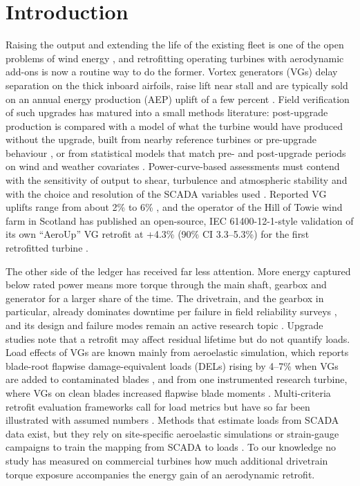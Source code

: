 \documentclass[preprint,12pt]{elsarticle}
\begin{document}
\linenumbers

\section{Introduction}

Raising the output and extending the life of the existing fleet is one of the open problems of wind energy \cite{veers19}, and retrofitting operating turbines with aerodynamic add-ons is now a routine way to do the former. Vortex generators (VGs) delay separation on the thick inboard airfoils, raise lift near stall and are typically sold on an annual energy production (AEP) uplift of a few percent \cite{lin02,zhao,mueller,baldacchino18,skrzypinski14}. Field verification of such upgrades has matured into a small methods literature: post-upgrade production is compared with a model of what the turbine would have produced without the upgrade, built from nearby reference turbines or pre-upgrade behaviour \cite{astolfi18,astolfi19,terzi,castellani}, or from statistical models that match pre- and post-upgrade periods on wind and weather covariates \cite{lee15,shin18,latiffianti22}. Power-curve-based assessments must contend with the sensitivity of output to shear, turbulence and atmospheric stability \cite{wagner09,stmartin16} and with the choice and resolution of the SCADA variables used \cite{gonzalez19,astolfi21}. Reported VG uplifts range from about 2\% to 6\% \cite{astolfi18,manolesos,moon,hwangbo17}, and the operator of the Hill of Towie wind farm in Scotland has published an open-source, IEC 61400-12-1-style \cite{iec} validation of its own ``AeroUp'' VG retrofit at +4.3\% (90\% CI 3.3--5.3\%) for the first retrofitted turbine \cite{clerc}.

The other side of the ledger has received far less attention. More energy captured below rated power means more torque through the main shaft, gearbox and generator for a larger share of the time. The drivetrain, and the gearbox in particular, already dominates downtime per failure in field reliability surveys \cite{ribrant,tavner07,spinato,faulstich11,pinar,carroll16,artigao}, and its design and failure modes remain an active research topic \cite{nejad22}. Upgrade studies note that a retrofit may affect residual lifetime \cite{astolfi19} but do not quantify loads. Load effects of VGs are known mainly from aeroelastic simulation, which reports blade-root flapwise damage-equivalent loads (DELs) rising by 4--7\% when VGs are added to contaminated blades \cite{kim}, and from one instrumented research turbine, where VGs on clean blades increased flapwise blade moments \cite{bak}. Multi-criteria retrofit evaluation frameworks call for load metrics but have so far been illustrated with assumed numbers \cite{ji}. Methods that estimate loads from SCADA data exist, but they rely on site-specific aeroelastic simulations or strain-gauge campaigns to train the mapping from SCADA to loads \cite{noppe18,veratudela17,dimitrov18}. To our knowledge no study has measured on commercial turbines how much additional drivetrain torque exposure accompanies the energy gain of an aerodynamic retrofit.
\end{document}
